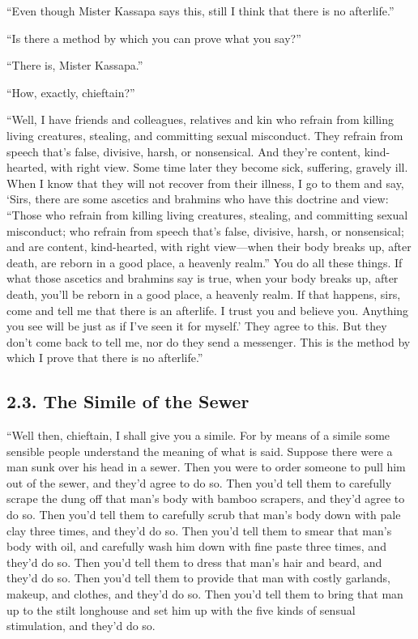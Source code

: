 \documentclass[12pt,openany]{book}%
\begin{document}
“Even though Mister Kassapa says this, still I think that there is no afterlife.” 

“Is there a method by which you can prove what you say?” 

“There is, Mister Kassapa.” 

“How, exactly, chieftain?” 

“Well, I have friends and colleagues, relatives and kin who refrain from killing living creatures, stealing, and committing sexual misconduct. They refrain from speech that’s false, divisive, harsh, or nonsensical. And they’re content, kind-hearted, with right view. Some time later they become sick, suffering, gravely ill. When I know that they will not recover from their illness, I go to them and say, ‘Sirs, there are some ascetics and brahmins who have this doctrine and view: “Those who refrain from killing living creatures, stealing, and committing sexual misconduct; who refrain from speech that’s false, divisive, harsh, or nonsensical; and are content, kind-hearted, with right view—when their body breaks up, after death, are reborn in a good place, a heavenly realm.” You do all these things. If what those ascetics and brahmins say is true, when your body breaks up, after death, you’ll be reborn in a good place, a heavenly realm. If that happens, sirs, come and tell me that there is an afterlife. I trust you and believe you. Anything you see will be just as if I’ve seen it for myself.’ They agree to this. But they don’t come back to tell me, nor do they send a messenger. This is the method by which I prove that there is no afterlife.” 

\subsection*{2.3. The Simile of the Sewer }

“Well then, chieftain, I shall give you a simile. For by means of a simile some sensible people understand the meaning of what is said. Suppose there were a man sunk over his head in a sewer. Then you were to order someone to pull him out of the sewer, and they’d agree to do so. Then you’d tell them to carefully scrape the dung off that man’s body with bamboo scrapers, and they’d agree to do so. Then you’d tell them to carefully scrub that man’s body down with pale clay three times, and they’d do so. Then you’d tell them to smear that man’s body with oil, and carefully wash him down with fine paste three times, and they’d do so. Then you’d tell them to dress that man’s hair and beard, and they’d do so. Then you’d tell them to provide that man with costly garlands, makeup, and clothes, and they’d do so. Then you’d tell them to bring that man up to the stilt longhouse and set him up with the five kinds of sensual stimulation, and they’d do so. 
\end{document}
